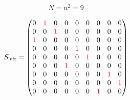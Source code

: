 \begin{align}
  N = n^2 = 9
\end{align}

\begin{align}
  S_{\text{left}} =
  \begin{pmatrix}
    0                  & \textcolor{red}{1} & 0                  & 0                  & 0                  & 0                  & 0                  & 0                  & 0                  \\
    0                  & 0                  & \textcolor{red}{1} & 0                  & 0                  & 0                  & 0                  & 0                  & 0                  \\
    \textcolor{red}{1} & 0                  & 0                  & 0                  & 0                  & 0                  & 0                  & 0                  & 0                  \\
    0                  & 0                  & 0                  & 0                  & \textcolor{red}{1} & 0                  & 0                  & 0                  & 0                  \\
    0                  & 0                  & 0                  & 0                  & 0                  & \textcolor{red}{1} & 0                  & 0                  & 0                  \\
    0                  & 0                  & 0                  & \textcolor{red}{1} & 0                  & 0                  & 0                  & 0                  & 0                  \\
    0                  & 0                  & 0                  & 0                  & 0                  & 0                  & 0                  & \textcolor{red}{1} & 0                  \\
    0                  & 0                  & 0                  & 0                  & 0                  & 0                  & 0                  & 0                  & \textcolor{red}{1} \\
    0                  & 0                  & 0                  & 0                  & 0                  & 0                  & \textcolor{red}{1} & 0                  & 0
  \end{pmatrix}
\end{align}

